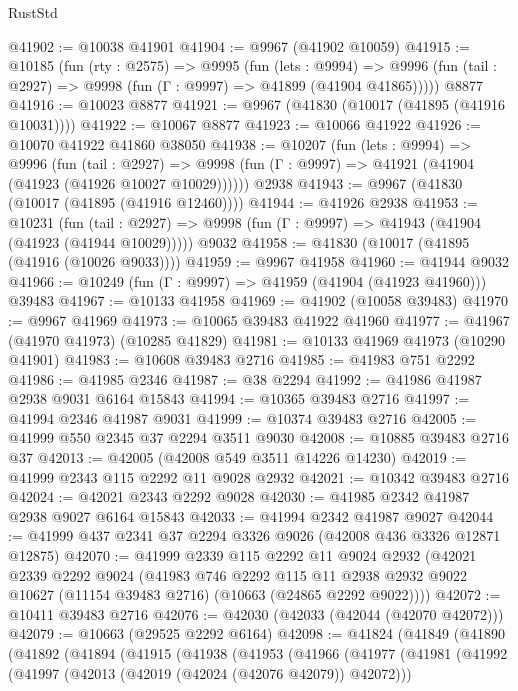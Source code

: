 \begin{lexlean}{RustStd}
\begin{coremodule}
@41902 := @10038 @41901
@41904 := @9967 (@41902 @10059)
@41915 := @10185
    (fun (rty : @2575) =>
    @9995
      (fun (lets : @9994) =>
      @9996 (fun (tail : @2927) => @9998 (fun (Γ : @9997) => @41899 (@41904 @41865)))))
    @8877
@41916 := @10023 @8877
@41921 := @9967 (@41830 (@10017 (@41895 (@41916 @10031))))
@41922 := @10067 @8877
@41923 := @10066 @41922
@41926 := @10070 @41922 @41860 @38050
@41938 := @10207
    (fun (lets : @9994) =>
    @9996
      (fun (tail : @2927) =>
      @9998 (fun (Γ : @9997) => @41921 (@41904 (@41923 (@41926 @10027 @10029))))))
    @2938
@41943 := @9967 (@41830 (@10017 (@41895 (@41916 @12460))))
@41944 := @41926 @2938
@41953 := @10231
    (fun (tail : @2927) => @9998 (fun (Γ : @9997) => @41943 (@41904 (@41923 (@41944 @10029)))))
    @9032
@41958 := @41830 (@10017 (@41895 (@41916 (@10026 @9033))))
@41959 := @9967 @41958
@41960 := @41944 @9032
@41966 := @10249 (fun (Γ : @9997) => @41959 (@41904 (@41923 @41960))) @39483
@41967 := @10133 @41958
@41969 := @41902 (@10058 @39483)
@41970 := @9967 @41969
@41973 := @10065 @39483 @41922 @41960
@41977 := @41967 (@41970 @41973) (@10285 @41829)
@41981 := @10133 @41969 @41973 (@10290 @41901)
@41983 := @10608 @39483 @2716
@41985 := @41983 @751 @2292
@41986 := @41985 @2346
@41987 := @38 @2294
@41992 := @41986 @41987 @2938 @9031 @6164 @15843
@41994 := @10365 @39483 @2716
@41997 := @41994 @2346 @41987 @9031
@41999 := @10374 @39483 @2716
@42005 := @41999 @550 @2345 @37 @2294 @3511 @9030
@42008 := @10885 @39483 @2716 @37
@42013 := @42005 (@42008 @549 @3511 @14226 @14230)
@42019 := @41999 @2343 @115 @2292 @11 @9028 @2932
@42021 := @10342 @39483 @2716
@42024 := @42021 @2343 @2292 @9028
@42030 := @41985 @2342 @41987 @2938 @9027 @6164 @15843
@42033 := @41994 @2342 @41987 @9027
@42044 := @41999 @437 @2341 @37 @2294 @3326 @9026 (@42008 @436 @3326 @12871 @12875)
@42070 := @41999
    @2339
    @115
    @2292
    @11
    @9024
    @2932
    (@42021
      @2339
      @2292
      @9024
      (@41983
        @746
        @2292
        @115
        @11
        @2938
        @2932
        @9022
        @10627
        (@11154 @39483 @2716)
        (@10663 (@24865 @2292 @9022))))
@42072 := @10411 @39483 @2716
@42076 := @42030 (@42033 (@42044 (@42070 @42072)))
@42079 := @10663 (@29525 @2292 @6164)
@42098 := @41824
    (@41849
      (@41890
        (@41892
          (@41894
            (@41915
              (@41938
                (@41953
                  (@41966
                    (@41977
                      (@41981
                        (@41992
                          (@41997 (@42013 (@42019 (@42024 (@42076 @42079)) @42072)))

\end{coremodule}
\end{lexlean}
